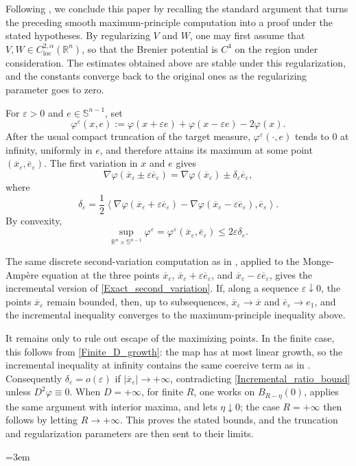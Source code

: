 \documentclass[11pt,a4paper,reqno]{amsart}
\numberwithin{equation}{section}
\theoremstyle{definition}
\newcommand{\<}{\ensuremath \leq}
\renewcommand{\>}{\ensuremath \geq}
\renewcommand{\epsilon}{\varepsilon}
\begin{document}
\bigskip

Following \cite{Alessio_Carlier_Santa}, we  conclude this paper by  recalling the standard argument that turns the preceding smooth maximum-principle computation into a proof under the stated hypotheses. By regularizing $V$ and $W$, one may first assume that $V,W\in C_{\mathrm{loc}}^{2,\alpha}(\mathbb{R}^n)$, so that the Brenier potential is $C^4$ on the region under consideration. The estimates obtained above are stable under this regularization, and the constants converge back to the original ones as the regularizing parameter goes to zero.

For $\epsilon>0$ and $e\in\mathbb{S}^{n-1}$, set
\[
    \varphi^\epsilon(x,e)
    :=
    \varphi(x+\epsilon e)+\varphi(x-\epsilon e)-2\varphi(x).
\]
After the usual compact truncation of the target measure, $\varphi^\epsilon(\cdot,e)$ tends to $0$ at infinity, uniformly in $e$, and therefore attains its maximum at some point $(\overline x_\epsilon,\overline e_\epsilon)$. The first variation in $x$ and $e$ gives
\[
    \nabla\varphi(\overline x_\epsilon\pm\epsilon\overline e_\epsilon)
    =
    \nabla\varphi(\overline x_\epsilon)\pm\delta_\epsilon \overline e_\epsilon,
\]
where
\[
    \delta_\epsilon
    =
    \frac{1}{2}\left\langle
    \nabla\varphi(\overline x_\epsilon+\epsilon\overline e_\epsilon)
    -
    \nabla\varphi(\overline x_\epsilon-\epsilon\overline e_\epsilon),
    \overline e_\epsilon
    \right\rangle.
\]
By convexity,
\begin{equation}\label{Incremental_ratio_bound}
    \sup_{\mathbb{R}^n\times\mathbb{S}^{n-1}}\varphi^\epsilon
    =
    \varphi^\epsilon(\overline x_\epsilon,\overline e_\epsilon)
    \le 2\epsilon\delta_\epsilon.
\end{equation}

The same discrete second-variation computation as in \cite{Alessio_Carlier_Santa}, applied to the Monge-Amp\`ere equation at the three points $\overline x_\epsilon$, $\overline x_\epsilon+\epsilon\overline e_\epsilon$, and $\overline x_\epsilon-\epsilon\overline e_\epsilon$, gives the incremental version of \cref{Exact_second_variation}. If, along a sequence $\epsilon\downarrow0$, the points $\overline x_\epsilon$ remain bounded, then, up to subsequences, $\overline x_\epsilon\to\overline x$ and $\overline e_\epsilon\to e_1$, and the incremental inequality converges to the maximum-principle inequality above.

It remains only to rule out escape of the maximizing points. In the finite case, this follows from \cref{Finite_D_growth}: the map has at most linear growth, so the incremental inequality at infinity contains the same coercive term as in \cite[Theorem 3.2]{Alessio_Carlier_Santa}. Consequently $\delta_\epsilon=o(\epsilon)$ if $|\overline x_\epsilon|\to+\infty$, contradicting \cref{Incremental_ratio_bound} unless $D^2\varphi\equiv0$. When $D=+\infty$, for finite $R$, one works on $B_{R-\eta}(0)$, applies the same argument with interior maxima, and lets $\eta\downarrow0$; the case $R=+\infty$ then follows by letting $R\to+\infty$. This proves the stated bounds, and the truncation and regularization parameters are then sent to their limits.

\begingroup
\emergencystretch=3em
\printbibliography
\endgroup
\end{document}
